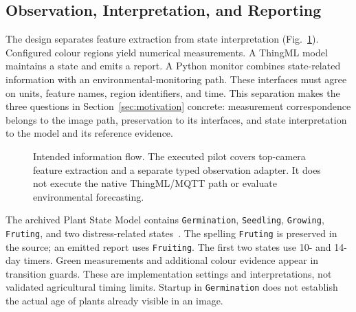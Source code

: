 \documentclass[runningheads]{llncs}
\newcommand{\code}[1]{\texttt{#1}}
\begin{document}
\subsection{Observation, Interpretation, and Reporting}
The design separates feature extraction from state interpretation (Fig.~\ref{fig:pipeline}). Configured colour regions yield numerical measurements. A ThingML model maintains a state and emits a report. A Python monitor combines state-related information with an environmental-monitoring path. These interfaces must agree on units, feature names, region identifiers, and time. This separation makes the three questions in Section~\ref{sec:motivation} concrete: measurement correspondence belongs to the image path, preservation to its interfaces, and state interpretation to the model and its reference evidence.

\begin{figure}[t]
\centering
{}
\caption{Intended information flow. The executed pilot covers top-camera feature extraction and a separate typed observation adapter. It does not execute the native ThingML/MQTT path or evaluate environmental forecasting.}
\label{fig:pipeline}
\end{figure}

The archived Plant State Model contains \code{Germination}, \code{Seedling}, \code{Growing}, \code{Fruting}, and two distress-related states~\cite{autotent}. The spelling \code{Fruting} is preserved in the source; an emitted report uses \code{Fruiting}. The first two states use 10- and 14-day timers. Green measurements and additional colour evidence appear in transition guards. These are implementation settings and interpretations, not validated agricultural timing limits. Startup in \code{Germination} does not establish the actual age of plants already visible in an image.
\end{document}
